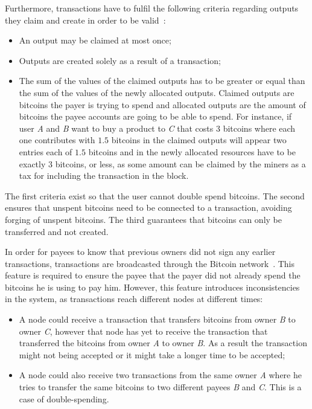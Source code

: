 Furthermore, transactions have to fulfil the following criteria regarding outputs they claim and create in order to be valid~\cite{decker2013information}:
\begin{itemize}
  \item An output may be claimed at most once;
  \item Outputs are created solely as a result of a transaction;
  \item The sum of the values of the claimed outputs has to be greater or equal than the sum of the values of the newly allocated outputs. Claimed outputs are bitcoins the payer is trying to spend and allocated outputs are the amount of bitcoins the payee accounts are going to be able to spend. For instance, if user \textsl{A} and \textsl{B} want to buy a product to \textsl{C} that costs $3$ bitcoins where each one contributes with $1.5$ bitcoins in the claimed outputs will appear two entries each of $1.5$ bitcoins and in the newly allocated resources have to be exactly $3$ bitcoins, or less, as some amount can be claimed by the miners as a tax for including the transaction in the block.
\end{itemize}

The first criteria exist so that the user cannot double spend bitcoins. The second ensures that unspent bitcoins need to be connected to a transaction, avoiding forging of unspent bitcoins. The third guarantees that bitcoins can only be transferred and not created.

In order for payees to know that previous owners did not sign any earlier transactions, transactions are broadcasted through the Bitcoin network~\cite{nakamoto2008bitcoin}. This feature is required to ensure the payee that the payer did not already spend the bitcoins he is using to pay him. However, this feature introduces inconsistencies in the system, as transactions reach different nodes at different times:
\begin{itemize}
    \item A node could receive a transaction that transfers bitcoins from owner \textsl{B} to owner \textsl{C}, however that node has yet to receive the transaction that transferred the bitcoins from owner \textsl{A} to owner \textsl{B}. As a result the transaction might not being accepted or it might take a longer time to be accepted;
    \item A node could also receive two transactions from the same owner \textsl{A} where he tries to transfer the same bitcoins to two different payees \textsl{B} and \textsl{C}. This is a case of double-spending.
\end{itemize}

